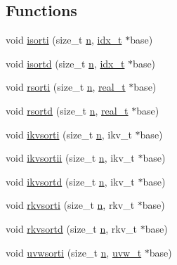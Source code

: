 \subsection*{Functions}
\begin{DoxyCompactItemize}
\item 
void \hyperlink{a00206_afc154279aa00bea9ce5c90b8c6906cc6}{isorti} (size\+\_\+t \hyperlink{a00623_a781a04ab095280f838ff3eb0e51312e0}{n}, \hyperlink{a00876_aaa5262be3e700770163401acb0150f52}{idx\+\_\+t} $\ast$base)
\item 
void \hyperlink{a00206_afe96a5fa1a6a4a60a13fe221567a793c}{isortd} (size\+\_\+t \hyperlink{a00623_a781a04ab095280f838ff3eb0e51312e0}{n}, \hyperlink{a00876_aaa5262be3e700770163401acb0150f52}{idx\+\_\+t} $\ast$base)
\item 
void \hyperlink{a00206_aa5a65b8ee3ec8f704ad120d4381cc79a}{rsorti} (size\+\_\+t \hyperlink{a00623_a781a04ab095280f838ff3eb0e51312e0}{n}, \hyperlink{a00876_a1924a4f6907cc3833213aba1f07fcbe9}{real\+\_\+t} $\ast$base)
\item 
void \hyperlink{a00206_a13855928d837857052613775a9c389b5}{rsortd} (size\+\_\+t \hyperlink{a00623_a781a04ab095280f838ff3eb0e51312e0}{n}, \hyperlink{a00876_a1924a4f6907cc3833213aba1f07fcbe9}{real\+\_\+t} $\ast$base)
\item 
void \hyperlink{a00206_a5789edd7474ebff4ba748d7f061d86fb}{ikvsorti} (size\+\_\+t \hyperlink{a00623_a781a04ab095280f838ff3eb0e51312e0}{n}, ikv\+\_\+t $\ast$base)
\item 
void \hyperlink{a00206_a1cc6186193b50112216341c8f7009826}{ikvsortii} (size\+\_\+t \hyperlink{a00623_a781a04ab095280f838ff3eb0e51312e0}{n}, ikv\+\_\+t $\ast$base)
\item 
void \hyperlink{a00206_ade88b48ed46595efb31adeaff9edd061}{ikvsortd} (size\+\_\+t \hyperlink{a00623_a781a04ab095280f838ff3eb0e51312e0}{n}, ikv\+\_\+t $\ast$base)
\item 
void \hyperlink{a00206_aa153a7b3b6df7eba8a8bd089764acf27}{rkvsorti} (size\+\_\+t \hyperlink{a00623_a781a04ab095280f838ff3eb0e51312e0}{n}, rkv\+\_\+t $\ast$base)
\item 
void \hyperlink{a00206_a6961f443a10dc76ff07a0c3498a808cb}{rkvsortd} (size\+\_\+t \hyperlink{a00623_a781a04ab095280f838ff3eb0e51312e0}{n}, rkv\+\_\+t $\ast$base)
\item 
void \hyperlink{a00206_a26aa6506404f80ed9e0b48249f4d4748}{uvwsorti} (size\+\_\+t \hyperlink{a00623_a781a04ab095280f838ff3eb0e51312e0}{n}, \hyperlink{a00710}{uvw\+\_\+t} $\ast$base)
\end{DoxyCompactItemize}


